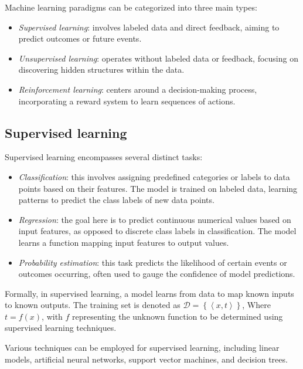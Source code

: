 Machine learning paradigms can be categorized into three main types:
\begin{itemize}
    \item \textit{Supervised learning}: involves labeled data and direct feedback, aiming to predict outcomes or future events.
    \item \textit{Unsupervised learning}: operates without labeled data or feedback, focusing on discovering hidden structures within the data.
    \item \textit{Reinforcement learning}: centers around a decision-making process, incorporating a reward system to learn sequences of actions.
\end{itemize}

\subsection{Supervised learning}
Supervised learning encompasses several distinct tasks:
\begin{itemize}
    \item \textit{Classification}: this involves assigning predefined categories or labels to data points based on their features. 
        The model is trained on labeled data, learning patterns to predict the class labels of new data points.
    \item \textit{Regression}: the goal here is to predict continuous numerical values based on input features, as opposed to discrete class labels in classification. 
        The model learns a function mapping input features to output values.
    \item \textit{Probability estimation}: this task predicts the likelihood of certain events or outcomes occurring, often used to gauge the confidence of model predictions.
\end{itemize}
Formally, in supervised learning, a model learns from data to map known inputs to known outputs. 
The training set is denoted as $\mathcal{D}=\left\{\left\langle x,t \right\rangle\right\}$, Where $t = f(x)$, with $f$ representing the unknown function to be determined using supervised learning techniques.

Various techniques can be employed for supervised learning, including linear models, artificial neural networks, support vector machines, and decision trees.

